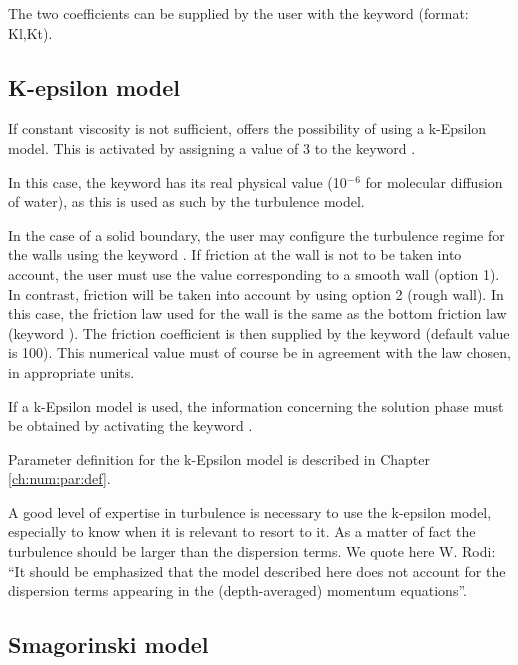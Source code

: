  The two coefficients can be supplied by the user with the keyword  (format: Kl,Kt).


\subsection{ K-epsilon model}

 If constant viscosity is not sufficient,  offers the possibility of using a k-Epsilon model. This is activated by assigning a value of 3 to the keyword .

 In this case, the keyword  has its real physical value (10${}^{-}$${}^{6}$ for molecular diffusion of water), as this is used as such by the turbulence model.

 In the case of a solid boundary, the user may configure the turbulence regime for the walls using the keyword . If friction at the wall is not to be taken into account, the user must use the value corresponding to a smooth wall (option 1). In contrast, friction will be taken into account by using option 2 (rough wall). In this case, the friction law used for the wall is the same as the bottom friction law (keyword ). The friction coefficient is then supplied by the keyword  (default value is 100). This numerical value must of course be in agreement with the law chosen, in appropriate units.

 If a k-Epsilon model is used, the information concerning the solution phase must be obtained by activating the keyword .

 Parameter definition for the k-Epsilon model is described in Chapter \ref{ch:num:par:def}.

 A good level of expertise in turbulence is necessary to use the k-epsilon model, especially to know when it is relevant to resort to it. As a matter of fact the turbulence should be larger than the dispersion terms. We quote here W. Rodi: ``It should be emphasized that the model described here does not account for the dispersion terms appearing in the (depth-averaged) momentum equations''.


\subsection{ Smagorinski model}

